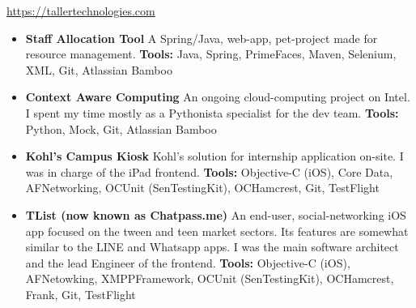 \documentclass[11pt,a4paper,english]{moderncv}
\begin{document}
{
\url{https://tallertechnologies.com}
\newline{}
\begin{itemize}
    \item \textbf{Staff Allocation Tool}
        \newline{}
        A Spring/Java, web-app, pet-project made for resource management.
        \newline{}
        \textbf{Tools:} Java, Spring, PrimeFaces, Maven, Selenium, XML, Git, Atlassian Bamboo
    \item \textbf{Context Aware Computing}
        \newline{}
        An ongoing cloud-computing project on Intel. I spent my time mostly as a Pythonista specialist for the dev team.
        \newline{}
        \textbf{Tools:} Python, Mock, Git, Atlassian Bamboo
    \item \textbf{Kohl's Campus Kiosk}
        \newline{}
        Kohl's solution for internship application on-site. I was in charge of the iPad frontend.
        \newline{}
        \textbf{Tools:} Objective-C (iOS), Core Data, AFNetworking, OCUnit (SenTestingKit), OCHamcrest, Git, TestFlight
    \item \textbf{TList (now known as Chatpass.me)}
        \newline{}
        An end-user, social-networking iOS app focused on the tween and teen market sectors. Its features are somewhat similar to the LINE and Whatsapp apps. I was the main software architect and the lead Engineer of the frontend.
        \newline{}
        \textbf{Tools:} Objective-C (iOS), AFNetowking, XMPPFramework, OCUnit (SenTestingKit), OCHamcrest, Frank, Git, TestFlight
\end{itemize}
}

\subsection{}
\end{document}
